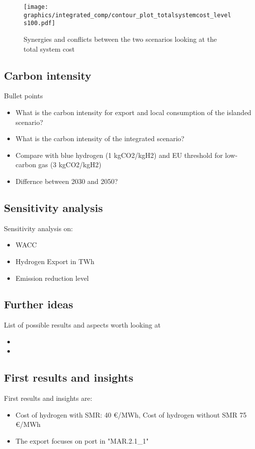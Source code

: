 \begin{figure}[h!]
    \centering
    \texttt{[image: graphics/integrated\_comp/contour\_plot\_totalsystemcost\_levels100.pdf]}
    \caption{Synergies and conflicts between the two scenarios looking at the total system cost}
    \label{fig:contour_plot_totalsystem}
\end{figure}

\subsection{Carbon intensity}
Bullet points
\begin{itemize}
    \item What is the carbon intensity for export and local consumption of the islanded scenario? 
    \item What is the carbon intensity of the integrated scenario?
    \item Compare with blue hydrogen (1 kgCO2/kgH2) and EU threshold for low-carbon gas (3 kgCO2/kgH2)
    \item Differnce between 2030 and 2050?
\end{itemize}



\subsection{Sensitivity analysis}
Sensitivity analysis on:
\begin{itemize}
    \item WACC
    \item Hydrogen Export in TWh
    \item Emission reduction level
\end{itemize}


\subsection{Further ideas}
List of possible results and aspects worth looking at
\begin{itemize}
    \item 
    \item 
\end{itemize}


\subsection{First results and insights}

First results and insights are:
\begin{itemize}
    \item Cost of hydrogen with SMR: 40 €/MWh, Cost of hydrogen without SMR 75 €/MWh
    \item The export focuses on port in "MAR.2.1{\_}1"
\end{itemize}


